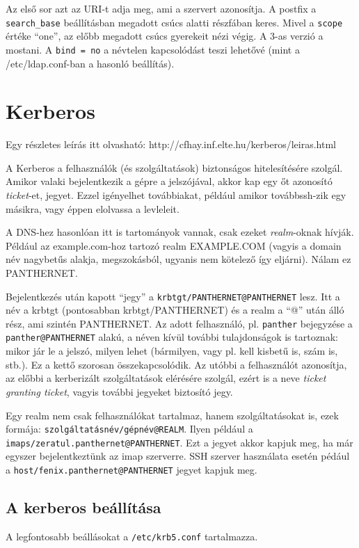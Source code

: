 \documentclass[fleqn,10pt,a4paper,titlepage]{article}
\begin{document}
  Az első sor azt az URI-t adja meg, ami a szervert azonosítja. A postfix a \texttt{search\_base} beállításban megadott
  csúcs alatti részfában keres. Mivel a \texttt{scope} értéke ``one'', az előbb megadott csúcs gyerekeit nézi végig. A
  3-as verzió  a mostani. A \texttt{bind = no} a névtelen kapcsolódást teszi lehetővé (mint a /etc/ldap.conf-ban a
  hasonló beállítás).

    
  \section{Kerberos}

  Egy részletes leírás itt olvasható: http://cfhay.inf.elte.hu/kerberos/leiras.html

  A Kerberos a felhasználók (és szolgáltatások) biztonságos hitelesítésére szolgál. Amikor valaki bejelentkezik a gépre
  a jelszójával, akkor kap egy őt azonosító \emph{ticket}-et, jegyet. Ezzel igényelhet továbbiakat, például amikor
  továbbssh-zik egy másikra, vagy éppen elolvassa a levleleit.
  
  A DNS-hez hasonlóan itt is tartományok vannak, csak ezeket \emph{realm}-oknak hívják. Például az example.com-hoz
  tartozó realm EXAMPLE.COM (vagyis a domain név nagybetűs alakja, megszokásból, ugyanis nem kötelező így
  eljárni). Nálam ez PANTHERNET.

  Bejelentkezés után kapott ``jegy'' a \texttt{krbtgt/PANTHERNET@PANTHERNET} lesz. Itt a név a krbtgt (pontosabban
  krbtgt/PANTHERNET) és a realm a ``@'' után álló rész, ami szintén PANTHERNET. Az adott felhasználó,
  pl. \texttt{panther} bejegyzése a \texttt{panther@PANTHERNET} alakú, a néven kívül további tulajdonságok is tartoznak:
  mikor jár le a jelszó, milyen lehet (bármilyen, vagy pl. kell kisbetű is, szám is, stb.). Ez a kettő szorosan
  összekapcsolódik. Az utóbbi a felhasználót azonosítja, az előbbi a kerberizált szolgáltatások elérésére szolgál, ezért
  is a neve \emph{ticket granting ticket}, vagyis további jegyeket biztosító jegy.
  
  Egy realm nem csak felhasználókat tartalmaz, hanem szolgáltatásokat is, ezek formája:
  \texttt{szolgáltatásnév/gépnév@REALM}. Ilyen például a \texttt{imaps/zeratul.panthernet@PANTHERNET}. Ezt a jegyet
  akkor kapjuk meg, ha már egyszer bejelentkeztünk az imap szerverre. SSH szerver használata esetén pédául a
  \texttt{host/fenix.panthernet@PANTHERNET} jegyet kapjuk meg.

  \subsection{A kerberos beállítása}
  A legfontosabb beállásokat a \texttt{/etc/krb5.conf} tartalmazza.
  
\end{document}
